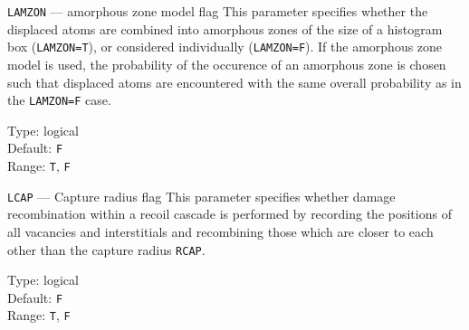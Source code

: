 \begin{keydescription}{\texttt{LAMZON} --- amorphous zone model flag}
%
  This parameter specifies whether the displaced atoms are combined into
  amorphous zones of the size of a histogram box (\texttt{LAMZON=T}), or
  considered individually (\texttt{LAMZON=F}). If the amorphous zone
  model is used, the probability of the occurence of an amorphous zone
  is chosen such that displaced atoms are encountered with the same
  overall probability as in the \texttt{LAMZON=F} case.
  \begin{keytab}
    Type:    \> logical \\
    Default: \> \texttt{F} \\
    Range:   \> \texttt{T}, \texttt{F}
  \end{keytab}
\end{keydescription}

\begin{keydescription}{\texttt{LCAP} --- Capture radius flag}
%
  This parameter specifies whether damage recombination within a recoil
  cascade is performed by recording the positions of all vacancies and
  interstitials and recombining those which are closer to each other
  than the capture radius \texttt{RCAP}.
  \begin{keytab}
    Type:    \> logical \\
    Default: \> \texttt{F} \\
    Range:   \> \texttt{T}, \texttt{F}
  \end{keytab}
\end{keydescription}

